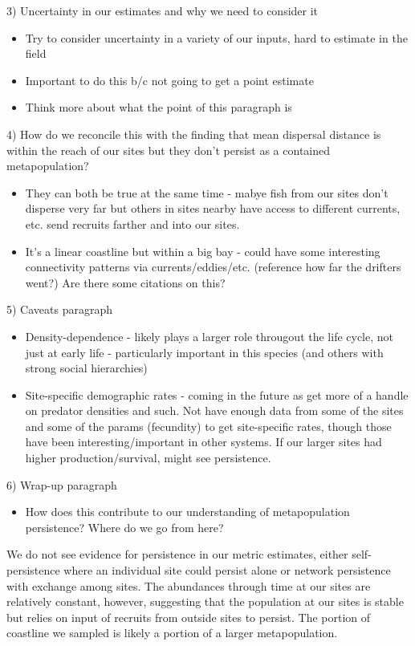 \documentclass[12pt, oneside]{article}   	%
\begin{document}
3) Uncertainty in our estimates and why we need to consider it
\begin{itemize}
	\item Try to consider uncertainty in a variety of our inputs, hard to estimate in the field
	\item Important to do this b/c not going to get a point estimate
	\item Think more about what the point of this paragraph is
\end{itemize}

4) How do we reconcile this with the finding that mean dispersal distance is within the reach of our sites but they don't persist as a contained metapopulation?
\begin{itemize}
	\item They can both be true at the same time - mabye fish from our sites don't disperse very far but others in sites nearby have access to different currents, etc. send recruits farther and into our sites. 
	\item It's a linear coastline but within a big bay - could have some interesting connectivity patterns via currents/eddies/etc. (reference how far the drifters went?) Are there some citations on this?
\end{itemize}

5) Caveats paragraph
\begin{itemize}
	\item Density-dependence - likely plays a larger role througout the life cycle, not just at early life - particularly important in this species (and others with strong social hierarchies)
	\item Site-specific demographic rates - coming in the future as get more of a handle on predator densities and such. Not have enough data from some of the sites and some of the params (fecundity) to get site-specific rates, though those have been interesting/important in other systems. If our larger sites had higher production/survival, might see persistence.
\end{itemize}

6) Wrap-up paragraph
\begin{itemize}
	\item How does this contribute to our understanding of metapopulation persistence? Where do we go from here?
\end{itemize}


We do not see evidence for persistence in our metric estimates, either self-persistence where an individual site could persist alone or network persistence with exchange among sites. The abundances through time at our sites are relatively constant, however, suggesting that the population at our sites is stable but relies on input of recruits from outside sites to persist. The portion of coastline we sampled is likely a portion of a larger metapopulation. %
\end{document}
